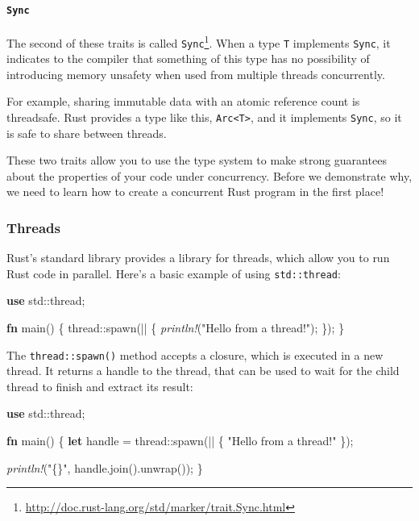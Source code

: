 \documentclass[a4paper,]{book}
\newenvironment{Shaded}{\begin{snugshade}}{\end{snugshade}}
\newcommand{\KeywordTok}[1]{\textcolor[rgb]{0.13,0.29,0.53}{\textbf{{#1}}}}
\newcommand{\StringTok}[1]{\textcolor[rgb]{0.31,0.60,0.02}{{#1}}}
\newcommand{\PreprocessorTok}[1]{\textcolor[rgb]{0.56,0.35,0.01}{\textit{{#1}}}}
\newcommand{\NormalTok}[1]{{#1}}
\renewcommand{\href}[2]{#2\footnote{\url{#1}}}
\let\oldparagraph\paragraph
\renewcommand{\paragraph}[1]{\oldparagraph{#1}\mbox{}}
\begin{document}
\paragraph{\texorpdfstring{\texttt{Sync}}{Sync}}\label{sync}

The second of these traits is called
\href{http://doc.rust-lang.org/std/marker/trait.Sync.html}{\texttt{Sync}}.
When a type \texttt{T} implements \texttt{Sync}, it indicates to the
compiler that something of this type has no possibility of introducing
memory unsafety when used from multiple threads concurrently.

For example, sharing immutable data with an atomic reference count is
threadsafe. Rust provides a type like this,
\texttt{Arc\textless{}T\textgreater{}}, and it implements \texttt{Sync},
so it is safe to share between threads.

These two traits allow you to use the type system to make strong
guarantees about the properties of your code under concurrency. Before
we demonstrate why, we need to learn how to create a concurrent Rust
program in the first place!

\subsubsection{Threads}\label{threads}

Rust's standard library provides a library for threads, which allow you
to run Rust code in parallel. Here's a basic example of using
\texttt{std::thread}:

\begin{Shaded}
\begin{Highlighting}[]
\KeywordTok{use} \NormalTok{std::thread;}

\KeywordTok{fn} \NormalTok{main() \{}
    \NormalTok{thread::spawn(|| \{}
        \PreprocessorTok{println!}\NormalTok{(}\StringTok{"Hello from a thread!"}\NormalTok{);}
    \NormalTok{\});}
\NormalTok{\}}
\end{Highlighting}
\end{Shaded}

The \texttt{thread::spawn()} method accepts a closure, which is executed
in a new thread. It returns a handle to the thread, that can be used to
wait for the child thread to finish and extract its result:

\begin{Shaded}
\begin{Highlighting}[]
\KeywordTok{use} \NormalTok{std::thread;}

\KeywordTok{fn} \NormalTok{main() \{}
    \KeywordTok{let} \NormalTok{handle = thread::spawn(|| \{}
        \StringTok{"Hello from a thread!"}
    \NormalTok{\});}

    \PreprocessorTok{println!}\NormalTok{(}\StringTok{"\{\}"}\NormalTok{, handle.join().unwrap());}
\NormalTok{\}}
\end{Highlighting}
\end{Shaded}
\end{document}
